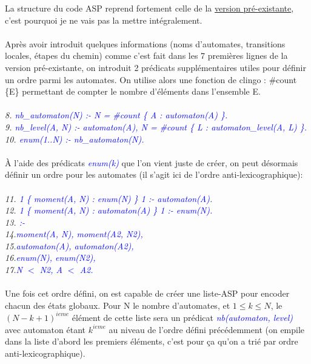 \documentclass[10pt,a4paper]{article}
\begin{document}
La structure du code ASP reprend fortement celle de la \hyperlink{preexistante}{version pré-existante}, c'est pourquoi je ne vais pas la mettre intégralement.\\ \\
Après avoir introduit quelques informations (noms d'automates, transitions locales, étapes du chemin) comme c'est fait dans les 7 premières lignes de la version pré-existante, on introduit 2 prédicats supplémentaires utiles pour 
définir un ordre parmi les automates. On utilise alors une fonction de clingo : \#count \{E\} permettant de compter le nombre d'éléments dans l'ensemble E.\\ \\
\emph{
	8. \textcolor{blue}{nb\_automaton(N) :- N = \#count \{ A : automaton(A) \}.}\\
	9. \textcolor{blue}{nb\_level(A, N) :- automaton(A), N = \#count \{ L : automaton\_level(A, L) \}.}\\
	10. \textcolor{blue}{enum(1..N) :- nb\_automaton(N).}\\ \\
}
\`A l'aide des prédicats \emph{\textcolor{blue}{enum(k)}} que l'on vient juste de créer, on peut désormais définir un ordre pour les automates (il s'agit ici de l'ordre anti-lexicographique):\\ \\
\emph{
	11. \textcolor{blue}{1 \{ moment(A, N) : enum(N) \} 1 :- automaton(A).}\\
	12. \textcolor{blue}{1 \{ moment(A, N) : automaton(A) \} 1 :- enum(N).}\\
	13. \textcolor{blue}{:- }\\
	14.\qquad\textcolor{blue}{moment(A, N), moment(A2, N2),}\\
	15.\qquad\textcolor{blue}{automaton(A), automaton(A2),}\\
	16.\qquad\textcolor{blue}{enum(N), enum(N2),}\\
	17.\qquad\textcolor{blue}{N $<$ N2, A $<$ A2.}\\ \\
}
Une fois cet ordre défini, on est capable de créer une liste-ASP pour encoder chacun des états globaux. Pour N le nombre d'automates, et $1\leq k\leq N$, le $(N-k+1)^{ieme}$ élément de cette liste sera un prédicat \textcolor{blue}{\emph{nb(automaton, level)}} avec automaton étant 
$k^{ieme}$ au niveau de l'ordre défini précédemment (on empile dans la liste d'abord les premiers éléments, c'est pour ça qu'on a trié par ordre anti-lexicographique).\\ \\
\end{document}
